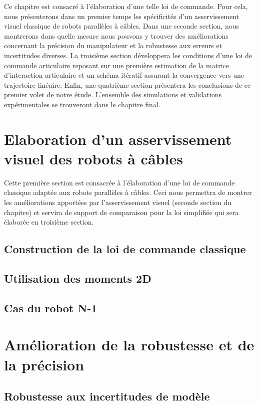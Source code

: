 Ce chapitre est consacré à l'élaboration d'une telle loi de commande. Pour cela, nous présenterons dans un premier temps les spécificités d'un asservissement visuel classique de robots parallèles à câbles. Dans une seconde section, nous montrerons dans quelle mesure nous pouvons y trouver des améliorations concernant la précision du manipulateur et la robustesse aux erreurs et incertitudes diverses. La troisième section développera les conditions d'une loi de commande articulaire reposant sur une première estimation de la matrice d'interaction articulaire et un schéma itératif assurant la convergence vers une trajectoire linéaire. Enfin, une quatrième section présentera les conclusions de ce premier volet de notre étude. L'ensemble des simulations et validations expérimentales se trouveront dans le chapitre final.

\section{Elaboration d'un asservissement visuel des robots à c\^ables}

Cette première section est consacrée à l'élaboration d'une loi de commande classique adaptée aux robots parallèles à câbles. Ceci nous permettra de montrer les améliorations apportées par l'asservissement visuel (seconde section du chapitre) et servira de support de comparaison pour la loi simplifiée qui sera élaborée en troisième section.

\subsection{Construction de la loi de commande classique}






\subsection{Utilisation des moments 2D}

\subsection{Cas du robot N-1}

\section{Amélioration de la robustesse et de la précision}

\subsection{Robustesse aux incertitudes de modèle}

